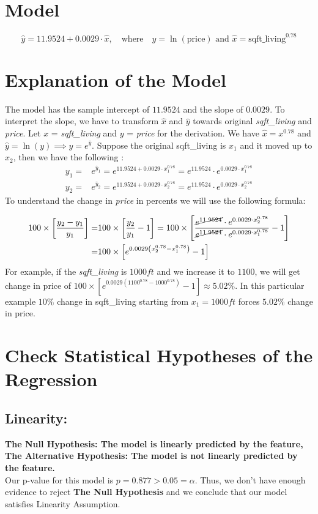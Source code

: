 \documentclass[12pt]{article}
\begin{document}
	\nopagebreak
\section*{Model}
	\[\hat{y}=11.9524+0.0029\cdot \hat{x},\quad \text{where}\quad  \hat{y}=\ln (\text{price})\text{ and } \hat{x} = \text{sqft\_living}^{0.78}  \]
\section*{Explanation of the Model}
The model has the sample intercept of \(11.9524\) and the slope of \(0.0029\).  To interpret the slope, we have to transform \(\hat{x}\) and \(\hat{y}\) towards original {\it sqft\_living} and {\it price}. Let \(x\) = {\it sqft\_living}  and \(y\) = {\it price} for the derivation. We have  \(\hat{x} = x^{0.78}\) and \(\hat{y} = \ln (y)\implies y  = e^{\hat{y}}\). Suppose the original sqft\_living is \(x_1\) and it moved up to \(x_2\), then we have the following :
\begin{align*}
	y_1 =& e^{\hat{y}_1 }= e^{11.9524+0.0029\cdot x_1^{0.78}}  = e^{11.9524}\cdot e^{0.0029\cdot x_1^{0.78}}\\
	y_2 =& e^{\hat{y}_2 }= e^{11.9524+0.0029\cdot x_2^{0.78}}  = e^{11.9524}\cdot e^{0.0029\cdot x_2^{0.78}}
\end{align*}
To understand the change in {\it price} in percents we will use the following formula:

\begin{align*}
100 \times \left[\frac{y_2-y_1}{y_1} \right] =& 100 \times \left[\frac{y_2}{y_1} - 1\right] = 100\times \left[\frac{ \cancel{e^{11.9524}}\cdot e^{0.0029\cdot x_2^{0.78}}}{\cancel{e^{11.9524}}\cdot e^{0.0029\cdot x_1^{0.78}}} -1 \right] \\
=& 100 \times \left[ e^{0.0029\left( x_2^{0.78} - x_1^{0.78} \right)} -1 \right]
\end{align*}
For example, if the {\it sqft\_living} is \(1000ft\) and we increase it to \(1100\), we will get change in price of \(100\times \left[e^{0.0029(1100^{0.78}-1000^{0.78})}-1\right] \approx 5.02\% \). In this particular example \(10\%\) change in sqft\_living starting from \(x_1 = 1000ft\) forces \(5.02\%\) change in price.
\section*{Check Statistical Hypotheses of the Regression}
\subsection*{Linearity:}
\textbf{The Null Hypothesis:  The model is linearly predicted by the feature,\\
The Alternative Hypothesis:  The model is not linearly predicted by the feature.}\\
Our p-value for this model is \(p=0.877 > 0.05 = \alpha\). Thus, we don't have enough evidence to reject \textbf{The Null Hypothesis} and  we conclude that our model satisfies Linearity Assumption.
\newpage
\end{document}
